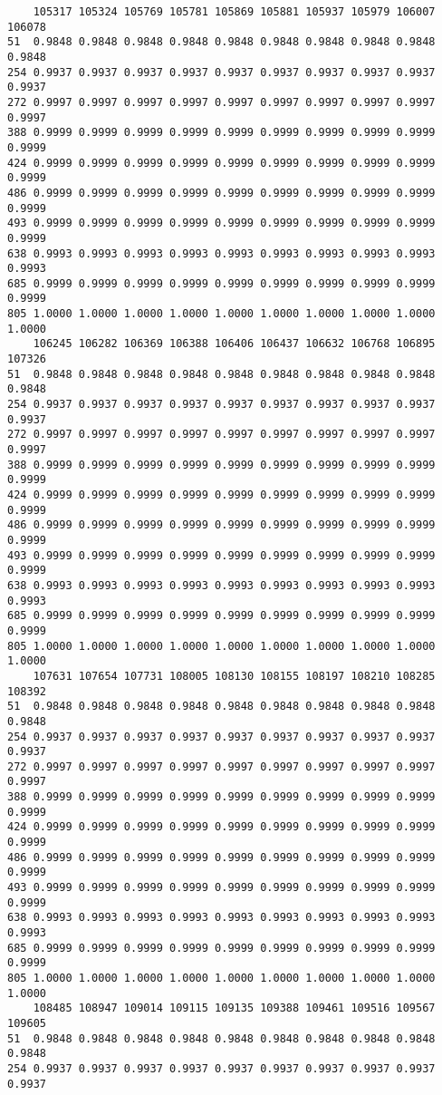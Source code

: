 \documentclass[
]{report}
\begin{document}
\begin{verbatim}
    105317 105324 105769 105781 105869 105881 105937 105979 106007 106078
51  0.9848 0.9848 0.9848 0.9848 0.9848 0.9848 0.9848 0.9848 0.9848 0.9848
254 0.9937 0.9937 0.9937 0.9937 0.9937 0.9937 0.9937 0.9937 0.9937 0.9937
272 0.9997 0.9997 0.9997 0.9997 0.9997 0.9997 0.9997 0.9997 0.9997 0.9997
388 0.9999 0.9999 0.9999 0.9999 0.9999 0.9999 0.9999 0.9999 0.9999 0.9999
424 0.9999 0.9999 0.9999 0.9999 0.9999 0.9999 0.9999 0.9999 0.9999 0.9999
486 0.9999 0.9999 0.9999 0.9999 0.9999 0.9999 0.9999 0.9999 0.9999 0.9999
493 0.9999 0.9999 0.9999 0.9999 0.9999 0.9999 0.9999 0.9999 0.9999 0.9999
638 0.9993 0.9993 0.9993 0.9993 0.9993 0.9993 0.9993 0.9993 0.9993 0.9993
685 0.9999 0.9999 0.9999 0.9999 0.9999 0.9999 0.9999 0.9999 0.9999 0.9999
805 1.0000 1.0000 1.0000 1.0000 1.0000 1.0000 1.0000 1.0000 1.0000 1.0000
    106245 106282 106369 106388 106406 106437 106632 106768 106895 107326
51  0.9848 0.9848 0.9848 0.9848 0.9848 0.9848 0.9848 0.9848 0.9848 0.9848
254 0.9937 0.9937 0.9937 0.9937 0.9937 0.9937 0.9937 0.9937 0.9937 0.9937
272 0.9997 0.9997 0.9997 0.9997 0.9997 0.9997 0.9997 0.9997 0.9997 0.9997
388 0.9999 0.9999 0.9999 0.9999 0.9999 0.9999 0.9999 0.9999 0.9999 0.9999
424 0.9999 0.9999 0.9999 0.9999 0.9999 0.9999 0.9999 0.9999 0.9999 0.9999
486 0.9999 0.9999 0.9999 0.9999 0.9999 0.9999 0.9999 0.9999 0.9999 0.9999
493 0.9999 0.9999 0.9999 0.9999 0.9999 0.9999 0.9999 0.9999 0.9999 0.9999
638 0.9993 0.9993 0.9993 0.9993 0.9993 0.9993 0.9993 0.9993 0.9993 0.9993
685 0.9999 0.9999 0.9999 0.9999 0.9999 0.9999 0.9999 0.9999 0.9999 0.9999
805 1.0000 1.0000 1.0000 1.0000 1.0000 1.0000 1.0000 1.0000 1.0000 1.0000
    107631 107654 107731 108005 108130 108155 108197 108210 108285 108392
51  0.9848 0.9848 0.9848 0.9848 0.9848 0.9848 0.9848 0.9848 0.9848 0.9848
254 0.9937 0.9937 0.9937 0.9937 0.9937 0.9937 0.9937 0.9937 0.9937 0.9937
272 0.9997 0.9997 0.9997 0.9997 0.9997 0.9997 0.9997 0.9997 0.9997 0.9997
388 0.9999 0.9999 0.9999 0.9999 0.9999 0.9999 0.9999 0.9999 0.9999 0.9999
424 0.9999 0.9999 0.9999 0.9999 0.9999 0.9999 0.9999 0.9999 0.9999 0.9999
486 0.9999 0.9999 0.9999 0.9999 0.9999 0.9999 0.9999 0.9999 0.9999 0.9999
493 0.9999 0.9999 0.9999 0.9999 0.9999 0.9999 0.9999 0.9999 0.9999 0.9999
638 0.9993 0.9993 0.9993 0.9993 0.9993 0.9993 0.9993 0.9993 0.9993 0.9993
685 0.9999 0.9999 0.9999 0.9999 0.9999 0.9999 0.9999 0.9999 0.9999 0.9999
805 1.0000 1.0000 1.0000 1.0000 1.0000 1.0000 1.0000 1.0000 1.0000 1.0000
    108485 108947 109014 109115 109135 109388 109461 109516 109567 109605
51  0.9848 0.9848 0.9848 0.9848 0.9848 0.9848 0.9848 0.9848 0.9848 0.9848
254 0.9937 0.9937 0.9937 0.9937 0.9937 0.9937 0.9937 0.9937 0.9937 0.9937

\end{verbatim}
\end{document}
